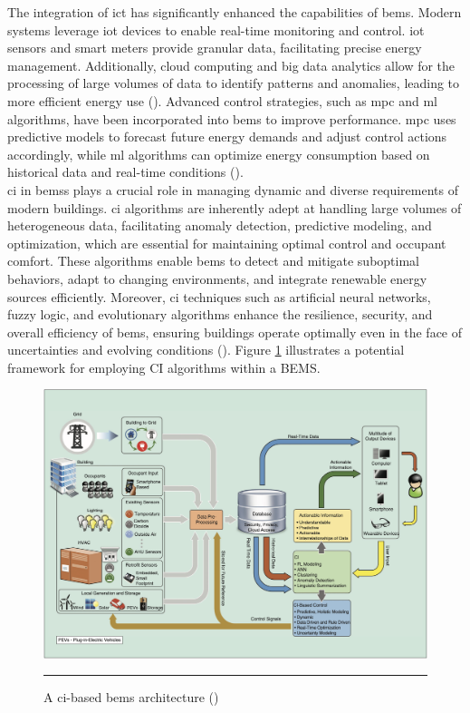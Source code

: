 The integration of \gls{ict} has significantly enhanced the capabilities of \gls{bems}.
Modern systems leverage \gls{iot} devices to enable real-time monitoring and control.
\gls{iot} sensors and smart meters provide granular data, facilitating precise energy management.
Additionally, cloud computing and big data analytics allow for the processing of large volumes of data to identify patterns and anomalies, leading to more efficient energy use (\cite{Bae2021}).
Advanced control strategies, such as \gls{mpc} and \gls{ml} algorithms, have been incorporated into \gls{bems} to improve performance.
\gls{mpc} uses predictive models to forecast future energy demands and adjust control actions accordingly, while \gls{ml} algorithms can optimize energy consumption based on historical data and real-time conditions (\cite{Afram2014}).
\\\gls{ci} in \glspl{bems} plays a crucial role in managing dynamic and diverse requirements of modern buildings.
\gls{ci} algorithms are inherently adept at handling large volumes of heterogeneous data, facilitating anomaly detection, predictive modeling, and optimization, which are essential for maintaining optimal control and occupant comfort.
These algorithms enable \gls{bems} to detect and mitigate suboptimal behaviors, adapt to changing environments, and integrate renewable energy sources efficiently.
Moreover, \gls{ci} techniques such as artificial neural networks, fuzzy logic, and evolutionary algorithms enhance the resilience, security, and overall efficiency of \gls{bems}, ensuring buildings operate optimally even in the face of uncertainties and evolving conditions (\cite{manic2016building}).
Figure \ref{fig:bems-ci-base-architecture} illustrates a potential framework for employing CI algorithms within a BEMS.

\begin{figure}[htbp]
    \centering
 \includegraphics[width=.9\textwidth]{03_Figures/literature-review/bems-ci-based-architecture.png}
     \rule{35em}{0.5pt}
    \caption{A \gls{ci}-based \gls{bems} architecture (\cite{manic2016building})} 
 \label{fig:bems-ci-base-architecture}
\end{figure}

